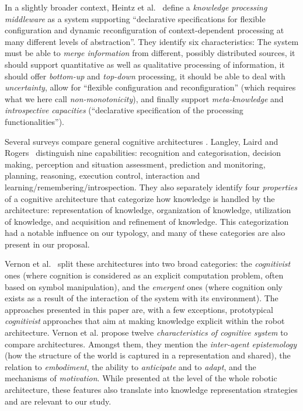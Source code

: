 \documentclass[journal]{IEEEtran}
\begin{document}
In a slightly broader context, Heintz et al.~\cite{Heintz2008} define a
\emph{knowledge processing middleware} as a system supporting ``declarative
specifications for flexible configuration and dynamic reconfiguration of
context-dependent processing at many different levels of abstraction''. They
identify six characteristics: The system must be able to \emph{merge
information} from different, possibly distributed sources, it should support
quantitative as well as qualitative processing of information, it should offer
\emph{bottom-up} and \emph{top-down} processing, it should be able to deal with
\emph{uncertainty}, allow for ``flexible configuration and reconfiguration''
(which requires what we here call \emph{non-monotonicity}), and finally support
\emph{meta-knowledge} and \emph{introspective capacities} (``declarative
specification of the processing functionalities'').

Several surveys compare general cognitive architectures \cite{Langley2006,
Vernon2007, Chong2009}. Langley, Laird and Rogers~\cite{Langley2006}
distinguish nine capabilities: recognition and categorisation, decision making,
perception and situation assessment, prediction and monitoring, planning,
reasoning, execution control, interaction and
learning/remembering/introspection. They also separately identify four
\emph{properties} of a cognitive architecture that categorize how knowledge is
handled by the architecture: representation of knowledge, organization of
knowledge, utilization of knowledge, and acquisition and refinement of
knowledge. This categorization had a notable influence on our typology, and
many of these categories are also present in our proposal.

Vernon et al.~\cite{Vernon2007} split these architectures into two broad
categories: the \emph{cognitivist} ones (where cognition is considered as an
explicit computation problem, often based on symbol manipulation), and the
\emph{emergent} ones (where cognition only exists as a result of the
interaction of the system with its environment). The approaches presented in
this paper are, with a few exceptions, prototypical \emph{cognitivist} approaches
that aim at making knowledge explicit within the robot architecture. Vernon et
al. propose twelve \emph{characteristics of cognitive system} to compare
architectures. Amongst them, they mention the \emph{inter-agent epistemology}
(how the structure of the world is captured in a representation and shared),
the relation to \emph{embodiment}, the ability to \emph{anticipate} and to
\emph{adapt}, and the mechanisms of \emph{motivation}. While presented at the
level of the whole robotic architecture, these features also translate into
knowledge representation strategies and are relevant to our study.
\end{document}
